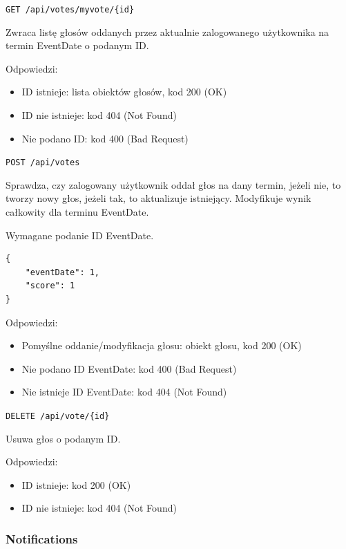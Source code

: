 \documentclass[a4paper,twoside,12pt]{book}
\begin{document}
\texttt{GET\ /api/votes/myvote/\{id\}}

Zwraca listę głosów oddanych przez aktualnie zalogowanego użytkownika na termin EventDate o podanym ID.

Odpowiedzi: 
\begin{itemize}
	\item ID istnieje: lista obiektów głosów, kod 200 (OK) 
	\item ID nie istnieje: kod 404 (Not Found) 
	\item Nie podano ID: kod 400 (Bad Request)
\end{itemize}

\label{cast-vote}

\texttt{POST\ /api/votes}

Sprawdza, czy zalogowany użytkownik oddał głos na dany termin, jeżeli nie, to tworzy nowy głos, jeżeli tak, to aktualizuje istniejący. Modyfikuje wynik całkowity dla terminu EventDate.

Wymagane podanie ID EventDate.

\begin{verbatim}
{
    "eventDate": 1,
    "score": 1
}
\end{verbatim}

Odpowiedzi: 
\begin{itemize}
	\item Pomyślne oddanie/modyfikacja głosu: obiekt głosu, kod 200 (OK) 
	\item Nie podano ID EventDate: kod 400 (Bad Request) 
	\item Nie istnieje ID EventDate: kod 404 (Not Found)
\end{itemize}

\label{delete-vote}

\texttt{DELETE\ /api/vote/\{id\}}

Usuwa głos o podanym ID.

Odpowiedzi: 
\begin{itemize}
	\item ID istnieje: kod 200 (OK) 
	\item ID nie istnieje: kod 404 (Not Found)
\end{itemize}

\subsubsection{Notifications}\label{notifications}

\label{get-all-my-notifications}
\end{document}
